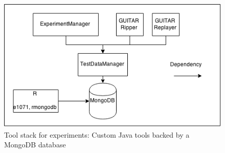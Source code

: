 \begin{figure}[ht]
\includegraphics[width=\linewidth]{images/Tools.png}
\caption{Tool stack for experiments: Custom Java tools backed by a MongoDB database}
\label{fig:tools}
\end{figure}